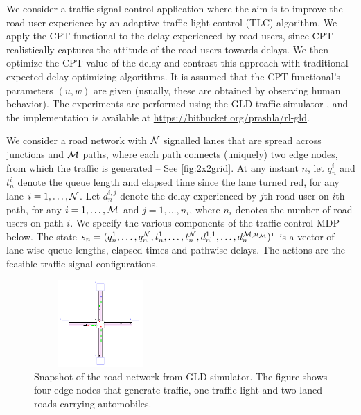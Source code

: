 We consider a traffic signal control application where the aim is to improve the road user experience by an adaptive traffic light control (TLC) algorithm.
We apply the CPT-functional to the delay experienced by road users, since CPT realistically captures the attitude of the road users towards delays. We then optimize the CPT-value of the delay and contrast this approach with traditional expected delay optimizing algorithms. It is assumed that the CPT functional's parameters $(u,w)$ are given (usually, these are obtained by observing human behavior). The experiments are performed using the GLD traffic simulator \cite{GLDSim}, and the implementation is available at \url{https://bitbucket.org/prashla/rl-gld}.

We consider a road network with $\mathcal{N}$ signalled lanes that are spread across junctions and $\mathcal{M}$ paths, where each path connects (uniquely) two edge nodes, from which the traffic is generated -- See \cref{fig:2x2grid}. 
At any instant $n$, let $q_n^i$ and $t_n^i$ denote the queue length and elapsed time since the lane turned red, for any lane $i = 1,\ldots, \mathcal{N}$. Let $d_n^{i,j}$ denote the delay experienced by $j$th road user on $i$th path, for any $i=1,\ldots,\mathcal{M}$ and $j=1,\ldots,n_i$, where $n_i$ denotes the number of road users on path $i$.
We specify the various components of the traffic control MDP below.
The state $s_n=(q_n^1,\ldots,q_n^{\mathcal{N}},t_n^1,\ldots,t_n^{\mathcal{N}},d_n^{1,1},\ldots,d_n^{\mathcal{M},n_{\mathcal{M}}})^\mathsf{\scriptscriptstyle T}$ is a vector of lane-wise queue lengths, elapsed times and pathwise delays.
The actions are the feasible traffic signal configurations. 

 \begin{figure}
    \centering
        \includegraphics[width=2in,height=1.3in]{fig/road-net.png}
\caption{Snapshot of the road network from GLD simulator. The figure shows four edge nodes that generate traffic, one traffic light and  two-laned roads carrying automobiles.}
\label{fig:road-net}
\end{figure}



